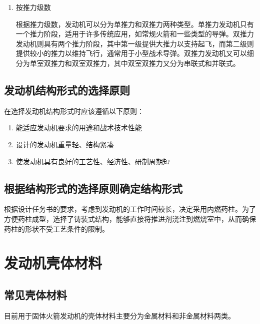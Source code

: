 \begin{enumerate}[leftmargin=0em,itemindent=2em]
    \item 按推力级数
    
    \qquad 根据推力级数，发动机可以分为单推力和双推力两种类型。单推力发动机只有一个推力阶段，适用于许多传统应用，如常规火箭和一些类型的导弹。双推力发动机则具有两个推力阶段，其中第一级提供大推力以支持起飞，而第二级则提供较小的推力以维持飞行，通常用于小型战术导弹。双推力发动机又可以细分为单室双推力和双室双推力，其中双室双推力又分为串联式和并联式。
\end{enumerate}

\subsection{发动机结构形式的选择原则}

在选择发动机结构形式时应该遵循以下原则：
\begin{enumerate}[leftmargin=2em]
    \item 能适应发动机要求的用途和战术技术性能
    \item 设计的发动机重量轻、结构紧凑
    \item 使发动机具有良好的工艺性、经济性、研制周期短
\end{enumerate}

\subsection{根据结构形式的选择原则确定结构形式}

根据设计任务书的要求，考虑到发动机的工作时间较长，决定采用内燃药柱。为了方便药柱成型，选择了铸装式结构，能够直接将推进剂浇注到燃烧室中，从而确保药柱的形状不受工艺条件的限制。

\section{发动机壳体材料}

\subsection{常见壳体材料}

目前用于固体火箭发动机的壳体材料主要分为金属材料和非金属材料两类。

